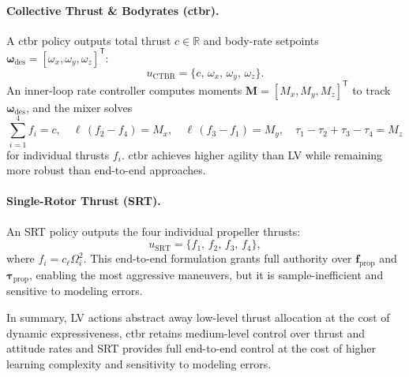 \paragraph{Collective Thrust \& Bodyrates (\gls{ctbr}).}  
A \gls{ctbr} policy outputs total thrust \(c\in\mathbb{R}\) and body-rate setpoints \(\boldsymbol{\omega}_{\mathrm{des}}=[\omega_x,\omega_y,\omega_z]^\mathsf{T}\):
\begin{equation}
u_{\mathrm{CTBR}} = \{c,\,\omega_x,\,\omega_y,\,\omega_z\}.
\end{equation}
An inner-loop rate controller computes moments \(\mathbf{M}=[M_x,M_y,M_z]^\mathsf{T}\) to track \(\boldsymbol{\omega}_{\mathrm{des}}\), and the mixer solves
\begin{equation}
\sum_{i=1}^4 f_i = c, 
\quad
\ell\,(f_2 - f_4) = M_x, 
\quad
\ell\,(f_3 - f_1) = M_y, 
\quad
\tau_1 - \tau_2 + \tau_3 - \tau_4 = M_z
\end{equation}
for individual thrusts \(f_i\). \gls{ctbr} achieves higher agility than LV while remaining more robust than end-to-end approaches.

\paragraph{Single-Rotor Thrust (SRT).}  
An SRT policy outputs the four individual propeller thrusts:
\begin{equation}
u_{\mathrm{SRT}} = \{f_1,\,f_2,\,f_3,\,f_4\},
\end{equation}
where \(f_i = c_\ell \Omega_i^2\). This end-to-end formulation grants full authority over \(\mathbf{f}_{\mathrm{prop}}\) and \(\boldsymbol{\tau}_{\mathrm{prop}}\), enabling the most aggressive maneuvers, but it is sample-inefficient and sensitive to modeling errors.

In summary, LV actions abstract away low-level thrust allocation at the cost of dynamic expressiveness, \gls{ctbr} retains medium-level control over thrust and attitude rates and SRT provides full end-to-end control at the cost of higher learning complexity and sensitivity to modeling errors.
